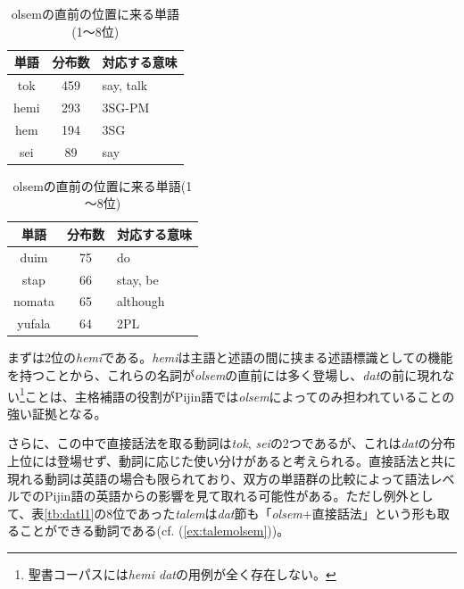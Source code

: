 \begin{table}[ht]
  \caption{olsemの直前の位置に来る単語(1～8位)}
  \label{tb:olseml1}
  \begin{minipage}{0.5\hsize}
  \begin{center}
    \begin{tabular}{|c||c|l|} \hline
      単語 & 分布数 & 対応する意味 \\ \hline \hline
      tok & 459 & say, talk\\ \hline
      hemi & 293 & 3SG-PM\\ \hline
      hem & 194 & 3SG\\ \hline
      sei & 89 & say\\ \hline
    \end{tabular}
  \end{center}
  \end{minipage}
  \begin{minipage}{0.5\hsize}
    \begin{center}
      \begin{tabular}{|c||c|l|} \hline
        単語 & 分布数 & 対応する意味 \\ \hline \hline
        duim & 75 & do \\ \hline
        stap & 66 & stay, be\\ \hline
        nomata & 65 & although\\ \hline
        yufala & 64 & 2PL\\ \hline
      \end{tabular}
    \end{center}
  \end{minipage}
\end{table}

まずは2位の\textit{hemi}である。\textit{hemi}は主語と述語の間に挟まる述語標識としての機能を持つことから、これらの名詞が\textit{olsem}の直前には多く登場し、\textit{dat}の前に現れない\footnote{
聖書コーパスには\textit{hemi dat}の用例が全く存在しない。}ことは、主格補語の役割がPijin語では\textit{olsem}によってのみ担われていることの強い証拠となる。

さらに、この中で直接話法を取る動詞は\textit{tok}, \textit{sei}の2つであるが、これは\textit{dat}の分布上位には登場せず、動詞に応じた使い分けがあると考えられる。直接話法と共に現れる動詞は英語の場合も限られており\citep[1024]{english}、双方の単語群の比較によって語法レベルでのPijin語の英語からの影響を見て取れる可能性がある。ただし例外として、表\ref{tb:datl1}の8位であった\textit{talem}は\textit{dat}節も「\textit{olsem}+直接話法」という形も取ることができる動詞である(cf. (\ref{ex:talemolsem}))。
